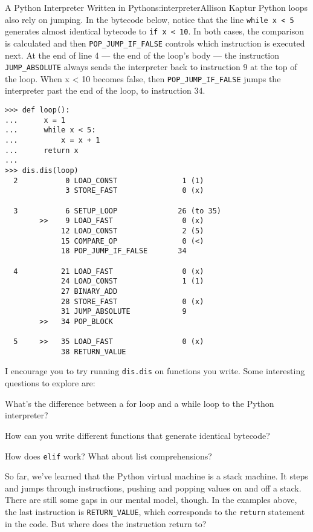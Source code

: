 \begin{aosachapter}{A Python Interpreter Written in Python}{s:interpreter}{Allison Kaptur}
Python loops also rely on jumping. In the bytecode below, notice that
the line \texttt{while x \textless{} 5} generates almost identical
bytecode to \texttt{if x \textless{} 10}. In both cases, the comparison
is calculated and then \texttt{POP\_JUMP\_IF\_FALSE} controls which
instruction is executed next. At the end of line 4 --- the end of the
loop's body --- the instruction \texttt{JUMP\_ABSOLUTE} always sends the
interpreter back to instruction 9 at the top of the loop. When x
\textless{} 10 becomes false, then \texttt{POP\_JUMP\_IF\_FALSE} jumps
the interpreter past the end of the loop, to instruction 34.

\begin{verbatim}
>>> def loop():
...      x = 1
...      while x < 5:
...          x = x + 1
...      return x
...
>>> dis.dis(loop)
  2           0 LOAD_CONST               1 (1)
              3 STORE_FAST               0 (x)

  3           6 SETUP_LOOP              26 (to 35)
        >>    9 LOAD_FAST                0 (x)
             12 LOAD_CONST               2 (5)
             15 COMPARE_OP               0 (<)
             18 POP_JUMP_IF_FALSE       34

  4          21 LOAD_FAST                0 (x)
             24 LOAD_CONST               1 (1)
             27 BINARY_ADD
             28 STORE_FAST               0 (x)
             31 JUMP_ABSOLUTE            9
        >>   34 POP_BLOCK

  5     >>   35 LOAD_FAST                0 (x)
             38 RETURN_VALUE
\end{verbatim}

\label{explore-bytecode}

I encourage you to try running \texttt{dis.dis} on functions you write.
Some interesting questions to explore are:

\begin{aosaitemize}

\item
  What's the difference between a for loop and a while loop to the
  Python interpreter?
\item
  How can you write different functions that generate identical
  bytecode?
\item
  How does \texttt{elif} work? What about list comprehensions?
\end{aosaitemize}

\label{frames}

So far, we've learned that the Python virtual machine is a stack
machine. It steps and jumps through instructions, pushing and popping
values on and off a stack. There are still some gaps in our mental
model, though. In the examples above, the last instruction is
\texttt{RETURN\_VALUE}, which corresponds to the \texttt{return}
statement in the code. But where does the instruction return to?


\end{aosachapter}
